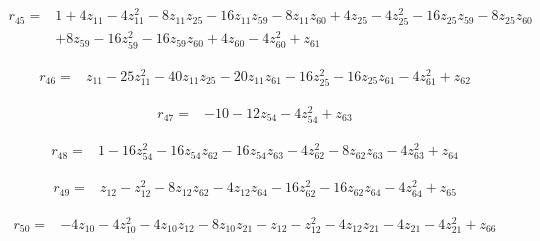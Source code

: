 \par\noindent\begin{minipage}{\linewidth}
\begin{align*}
r_{45}={}&1+4z_{11}-4z_{11}^{2}-8z_{11}z_{25}-16z_{11}z_{59}-8z_{11}z_{60}+4z_{25}-4z_{25}^{2}-16z_{25}z_{59}-8z_{25}z_{60}\\[-2pt]
&+8z_{59}-16z_{59}^{2}-16z_{59}z_{60}+4z_{60}-4z_{60}^{2}+z_{61}
\end{align*}
\end{minipage}\par
\par\noindent\begin{minipage}{\linewidth}
\begin{align*}
r_{46}={}&z_{11}-25z_{11}^{2}-40z_{11}z_{25}-20z_{11}z_{61}-16z_{25}^{2}-16z_{25}z_{61}-4z_{61}^{2}+z_{62}
\end{align*}
\end{minipage}\par
\par\noindent\begin{minipage}{\linewidth}
\begin{align*}
r_{47}={}&-10-12z_{54}-4z_{54}^{2}+z_{63}
\end{align*}
\end{minipage}\par
\par\noindent\begin{minipage}{\linewidth}
\begin{align*}
r_{48}={}&1-16z_{54}^{2}-16z_{54}z_{62}-16z_{54}z_{63}-4z_{62}^{2}-8z_{62}z_{63}-4z_{63}^{2}+z_{64}
\end{align*}
\end{minipage}\par
\par\noindent\begin{minipage}{\linewidth}
\begin{align*}
r_{49}={}&z_{12}-z_{12}^{2}-8z_{12}z_{62}-4z_{12}z_{64}-16z_{62}^{2}-16z_{62}z_{64}-4z_{64}^{2}+z_{65}
\end{align*}
\end{minipage}\par
\par\noindent\begin{minipage}{\linewidth}
\begin{align*}
r_{50}={}&-4z_{10}-4z_{10}^{2}-4z_{10}z_{12}-8z_{10}z_{21}-z_{12}-z_{12}^{2}-4z_{12}z_{21}-4z_{21}-4z_{21}^{2}+z_{66}
\end{align*}
\end{minipage}\par
